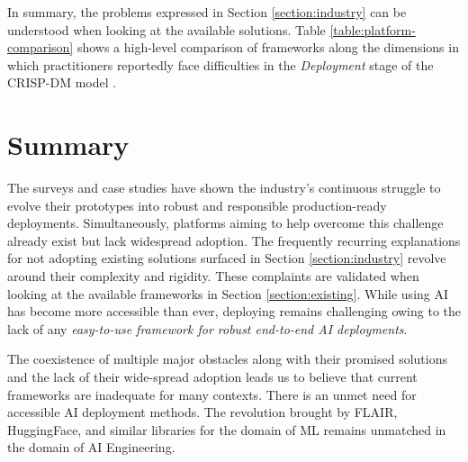 In summary, the problems expressed in Section \ref{section:industry} can be understood when looking at the available solutions. Table \ref{table:platform-comparison} shows a high-level comparison of frameworks along the dimensions in which practitioners reportedly face difficulties in the \textit{Deployment} stage of the CRISP-DM model \cite{wirth2000crisp}.

\section{Summary}

The surveys and case studies have shown the industry's continuous struggle to evolve their prototypes into robust and responsible production-ready deployments. Simultaneously, platforms aiming to help overcome this challenge already exist but lack widespread adoption. The frequently recurring explanations for not adopting existing solutions surfaced in Section \ref{section:industry} revolve around their complexity and rigidity. These complaints are validated when looking at the available frameworks in Section \ref{section:existing}. While using AI has become more accessible than ever, deploying remains challenging owing to the lack of any \textit{easy-to-use framework for robust end-to-end AI deployments}.

The coexistence of multiple major obstacles along with their promised solutions and the lack of their wide-spread adoption leads us to believe that current frameworks are inadequate for many contexts. There is an unmet need for accessible AI deployment methods. The revolution brought by FLAIR, HuggingFace, and similar libraries for the domain of ML remains unmatched in the domain of AI Engineering.
